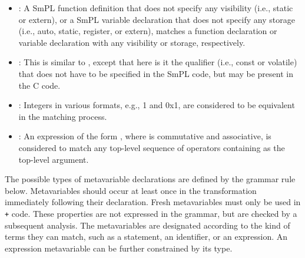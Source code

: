 \documentclass{article}
\begin{document}
\begin{itemize}
\item {}: A SmPL function definition that does not
  specify any visibility (i.e., static or extern), or a SmPL variable
  declaration that does not specify any storage (i.e., auto, static,
  register, or extern), matches a function declaration or variable
  declaration with any visibility or storage, respectively.
\item {}: This is similar to ,
  except that here is it the qualifier (i.e., const or volatile) that does
  not have to be specified in the SmPL code, but may be present in the C code.
\item {}: Integers in various formats, e.g., 1 and 0x1, are
  considered to be equivalent in the matching process.
\item {}: An expression of the form  
  , where  is commutative and associative, is
  considered to match any top-level sequence of  operators
  containing  as the top-level argument.
\end{itemize}

The possible types of metavariable declarations are defined by the grammar
rule below.  Metavariables should occur at least once in the transformation
immediately following their declaration.  Fresh metavariables must only be
used in {\tt +} code.  These properties are not expressed in the grammar,
but are checked by a subsequent analysis.  The metavariables are designated
according to the kind of terms they can match, such as a statement, an
identifier, or an expression.  An expression metavariable can be further
constrained by its type.
\end{document}
